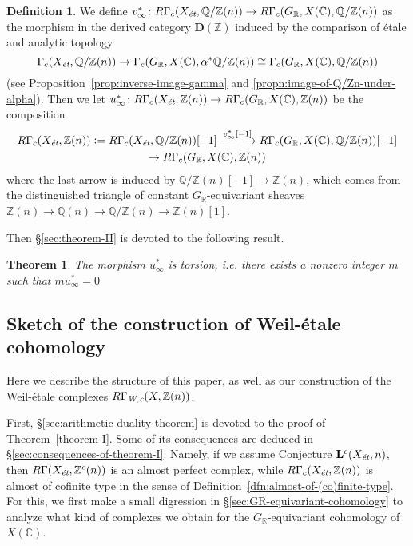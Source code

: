 \documentclass[leqno,12pt]{article}
\theoremstyle{plain}
\newtheorem{maintheorem}{Theorem}
\theoremstyle{definition}
\newtheorem{definition}[theorem]{\indent\sc Definition}
\newcommand{\CC}{\mathbb{C}}
\newcommand{\QQ}{\mathbb{Q}}
\newcommand{\RR}{\mathbb{R}}
\newcommand{\ZZ}{\mathbb{Z}}
\newcommand{\dfn}{\mathrel{\mathop:}=}
\newcommand{\Wc}{\text{\it W,c}}
\newcommand{\et}{\text{\it \'{e}t}}
\newcommand{\DZ}{{\mathbf{D} (\ZZ)}}
\begin{document}
\begin{definition}
  \label{dfn:u-infty}
  We define
  $v_\infty^*\colon R\Gamma_c (X_\et, \QQ/\ZZ (n)) \to R\Gamma_c (G_\RR, X
  (\CC), \QQ/\ZZ (n))$ as the morphism in the derived category $\DZ$ induced by
  the comparison of \'{e}tale and analytic topology
  \[ \Gamma_c (X_\et, \QQ/\ZZ (n)) \to
  \Gamma_c (G_\RR, X (\CC), \alpha^* \QQ/\ZZ (n)) \cong
  \Gamma_c (G_\RR, X (\CC), \QQ/\ZZ (n)) \]
  (see Proposition~\ref{prop:inverse-image-gamma} and
  \ref{propn:image-of-Q/Zn-under-alpha}). Then we let
  $u_\infty^*\colon R\Gamma_c (X_\et, \ZZ(n)) \to R\Gamma_c (G_\RR, X (\CC), \ZZ (n))$
  be the composition
  \begin{multline*}
    R\Gamma_c (X_\et, \ZZ(n)) \dfn R\Gamma_c (X_\et, \QQ/\ZZ (n)) [-1]
    \xrightarrow{v_\infty^* [-1]} R\Gamma_c (G_\RR, X (\CC), \QQ/\ZZ (n)) [-1]
    \\ \to R\Gamma_c (G_\RR, X (\CC), \ZZ (n))
  \end{multline*}
  where the last arrow is induced by $\QQ/\ZZ (n) [-1] \to \ZZ (n)$, which comes
  from the distinguished triangle of constant $G_\RR$-equivariant sheaves
  $\ZZ (n) \to \QQ (n) \to \QQ/\ZZ (n) \to \ZZ (n) [1]$.
\end{definition}

Then \S\ref{sec:theorem-II} is devoted to the following result.

\begin{maintheorem}
  \label{theorem-II}
  The morphism $u_\infty^*$ is torsion, i.e. there exists a nonzero integer $m$
  such that $mu^*_\infty = 0$
\end{maintheorem}

\subsection*{Sketch of the construction of Weil-\'{e}tale cohomology}

Here we describe the structure of this paper, as well as our construction of the
Weil-\'{e}tale complexes $R\Gamma_\Wc (X, \ZZ (n))$.

First, \S\ref{sec:arithmetic-duality-theorem} is devoted to the proof of
Theorem~\ref{theorem-I}. Some of its consequences are deduced in
\S\ref{sec:consequences-of-theorem-I}. Namely, if we assume Conjecture
$\mathbf{L}^c (X_\et, n)$, then $R\Gamma (X_\et, \ZZ^c (n))$ is an almost
perfect complex, while $R\Gamma_c (X_\et, \ZZ (n))$ is almost of cofinite type
in the sense of Definition~\ref{dfn:almost-of-(co)finite-type}. For this, we
first make a small digression in \S\ref{sec:GR-equivariant-cohomology} to
analyze what kind of complexes we obtain for the $G_\RR$-equivariant cohomology
of $X (\CC)$.
\end{document}
